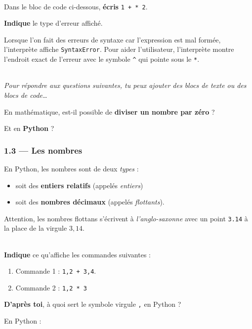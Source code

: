 \documentclass[a4paper,17pt]{extarticle}
\newenvironment{eleve}%
{\begin{activite}\color{noiramu}\\[-0.5cm]}
{\end{activite}}
\providecommand{\tightlist}{%
      \setlength{\itemsep}{0pt}\setlength{\parskip}{0pt}}
\begin{document}
\begin{eleve}
    Dans le bloc de code ci-dessous, \textbf{écris} \texttt{1\ +\ *\ 2}.

\textbf{Indique} le type d'erreur affiché.
        
        \end{eleve}\begin{reponse}
    Lorsque l'on fait des erreurs de syntaxe car l'expression est mal
formée, l'interprète affiche \texttt{SyntaxError}. Pour aider
l'utilisateur, l'interprète montre l'endroit exact de l'erreur avec le
symbole \texttt{\^{}} qui pointe sous le \texttt{*}.

        \end{reponse}\begin{eleve}
    \emph{Pour répondre aux questions suivantes, tu peux ajouter des blocs
de texte ou des blocs de code\ldots{}}

En mathématique, est-il possible de \textbf{diviser un nombre par zéro}
?

Et en \textbf{Python} ?
        
        \end{eleve}
    \hypertarget{les-nombres}{%
\subsubsection{1.3 --- Les nombres}\label{les-nombres}}
\begin{retenir}
    En Python, les nombres sont de deux \emph{types} :

\begin{itemize}
\tightlist
\item
  soit des \textbf{entiers relatifs} (appelés \emph{entiers})
\item
  soit des \textbf{nombres décimaux} (appelés \emph{flottants}).
\end{itemize}

        \end{retenir}\begin{remarque}
    Attention, les nombres flottans s'écrivent à \emph{l'anglo-saxonne} avec
un point \texttt{3.14} à la place de la virgule \(3,14\).

        \end{remarque}\begin{eleve}
    \textbf{Indique} ce qu'affiche les commandes suivantes :

\begin{enumerate}
\def\labelenumi{\arabic{enumi}.}
\tightlist
\item
  Commande 1 : \texttt{1,2\ +\ 3,4}.
\item
  Commande 2 : \texttt{1,2\ *\ 3}
\end{enumerate}

\textbf{D'après toi}, à quoi sert le symbole virgule \texttt{,} en
Python ?
        
        \end{eleve}
    En Python :
\end{document}
